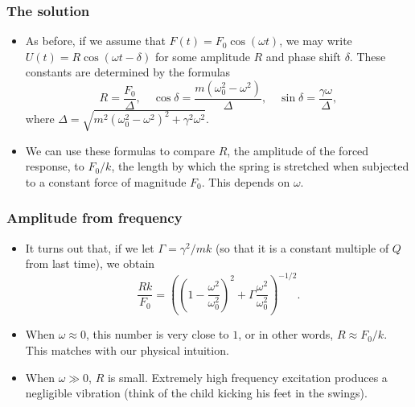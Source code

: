 \begin{frame}

\frametitle{The solution}
\label{thesolution}

\begin{itemize}
\item As before, if we assume that $ F(t) = F_0 \cos{(\omega t)} $, we may write $ U(t) = R \cos{(\omega t - \delta)} $ for some amplitude $ R $ and phase shift $ \delta $. These constants are determined by the formulas
\[
R = \frac{F_0}{\Delta}, \quad \cos \delta = \frac{m(\omega_0^2 - \omega^2)}{\Delta}, \quad \sin \delta = \frac{\gamma \omega}{\Delta},
\]
where $ \Delta = \sqrt{m^2(\omega_0^2 - \omega^2)^2 + \gamma^2 \omega^2} $.

\item We can use these formulas to compare $ R $, the amplitude of the forced response, to $ F_0/k $, the length by which the spring is stretched when subjected to a constant force of magnitude $ F_0 $. This depends on $ \omega $.

\end{itemize}

\end{frame}

\begin{frame}

\frametitle{Amplitude from frequency}
\label{amplitudefromfrequency}

\begin{itemize}
\item It turns out that, if we let $ \Gamma = \gamma^2/mk $ (so that it is a constant multiple of $ Q $ from last time), we obtain
\[
\frac{Rk}{F_0} = \left( \left( 1 - \frac{\omega^2}{\omega_0^2} \right)^2 + \Gamma \frac{\omega^2}{\omega_0^2} \right)^{-1/2}.
\]

\item When $ \omega \approx 0 $, this number is very close to $ 1 $, or in other words, $ R \approx F_0/k $. This matches with our physical intuition.

\item When $ \omega \gg 0 $, $ R $ is small. Extremely high frequency excitation produces a negligible vibration (think of the child kicking his feet in the swings).

\end{itemize}

\end{frame}

